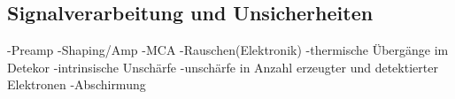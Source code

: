 \subsection{Signalverarbeitung und Unsicherheiten}
-Preamp
-Shaping/Amp
-MCA
-Rauschen(Elektronik)
-thermische Übergänge im Detekor
-intrinsische Unschärfe
-unschärfe in Anzahl erzeugter und detektierter Elektronen
-Abschirmung



